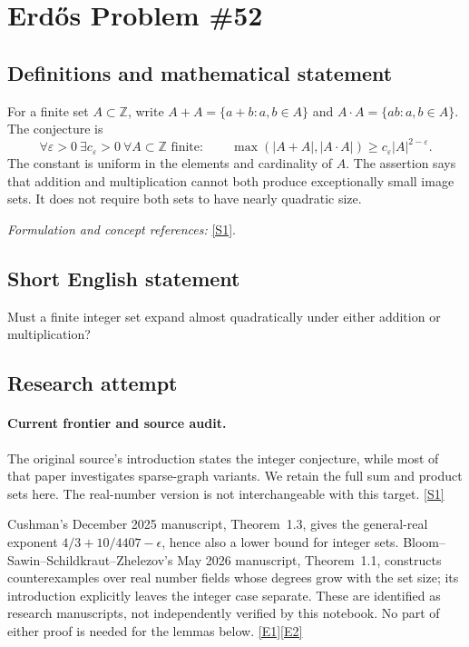 \documentclass[11pt,a4paper]{article}
\newcommand{\Z}{\mathbb{Z}}
\newcommand{\sref}[2]{\hyperlink{source:#1:#2}{[S#2]}}
\newcommand{\eref}[2]{\hyperlink{extra:#1:#2}{[E#2]}}
\newif\ifshowcatalogue
\newcommand{\cataloguescope}[1]{\ifshowcatalogue
 \paragraph{Exact scope in the supplied catalogue.}
 \begin{quote}\small #1\end{quote}\fi}
\numberwithin{equation}{section}
\begin{document}
\setcounter{section}{0}
\clearpage
\section*{\texorpdfstring{Erdős Problem \#52}{Erdős Problem \#52}}\label{statement}
\subsection{Definitions and mathematical statement}
For a finite set $A\subset\Z$, write $A+A=\{a+b:a,b\in A\}$ and $A\cdot A=\{ab:a,b\in A\}$. The conjecture is
\[
 \forall\varepsilon>0\ \exists c_\varepsilon>0\ \forall A\subset\Z\text{ finite}:\qquad
 \max(|A+A|,|A\cdot A|)\ge c_\varepsilon|A|^{2-\varepsilon}.
\]
The constant is uniform in the elements and cardinality of $A$. The assertion says that addition and multiplication cannot both produce exceptionally small image sets. It does not require both sets to have nearly quadratic size.
\par\smallskip\textit{Formulation and concept references:} \sref{statement}{1}.
\cataloguescope{Prove that for every epsilon greater than zero there is a constant c\_epsilon greater than zero such that every finite set A of integers satisfies max(|A+A|, |A*A|) at least c\_epsilon times |A|\textasciicircum{}(2-epsilon).}
\subsection{Short English statement}
Must a finite integer set expand almost quadratically under either addition or multiplication?
\subsection{Research attempt}

\paragraph{Current frontier and source audit.}
The original source's introduction states the integer conjecture, while
most of that paper investigates sparse-graph variants. We retain the full
sum and product sets here. The real-number version is not interchangeable
with this target. \sref{statement}{1}

Cushman's December 2025 manuscript, Theorem~1.3, gives the general-real
exponent $4/3+10/4407-\epsilon$, hence also a lower bound for integer sets.
Bloom--Sawin--Schildkraut--Zhelezov's May 2026 manuscript, Theorem~1.1,
constructs counterexamples over real number fields whose degrees grow
with the set size; its introduction explicitly leaves the integer case
separate. These are identified as research manuscripts, not independently
verified by this notebook. No part of either proof is needed for the
lemmas below. \eref{statement}{1}\eref{statement}{2}
\end{document}
